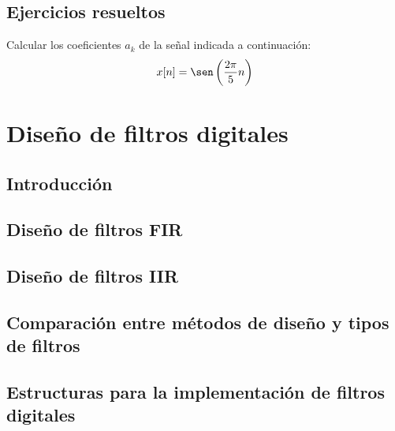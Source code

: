 \documentclass[a4paper]{book}
\begin{document}
\section{Ejercicios resueltos}


Calcular los coeficientes $a_k$ de la señal indicada a continuación: \[ x[n] = \sen \left( \frac{2\pi}{5}n \right) \]



\chapter{Diseño de filtros digitales} \label{temaDeFiltros}

\section{Introducción}

\section{Diseño de filtros FIR}

\section{Diseño de filtros IIR}

\section{Comparación entre métodos de diseño y tipos de filtros}

\section{Estructuras para la implementación de filtros digitales}

\end{document}
